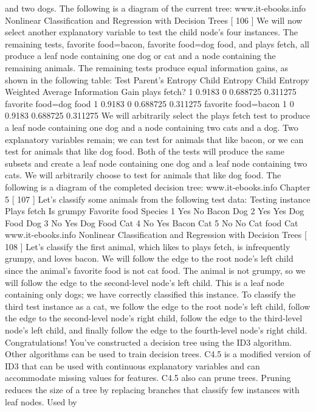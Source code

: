 and two dogs. The following is a diagram of the current tree:
www.it-ebooks.info
Nonlinear Classification and Regression with Decision Trees
[ 106 ]
We will now select another explanatory variable to test the child node's four
instances. The remaining tests, favorite food=bacon, favorite food=dog food,
and plays fetch, all produce a leaf node containing one dog or cat and a node
containing the remaining animals. The remaining tests produce equal information
gains, as shown in the following table:
Test Parent's
Entropy
Child
Entropy
Child
Entropy
Weighted
Average
Information
Gain
plays fetch? 1 0.9183 0 0.688725 0.311275
favorite
food=dog
food
1 0.9183 0 0.688725 0.311275
favorite
food=bacon 1 0 0.9183 0.688725 0.311275
We will arbitrarily select the plays fetch test to produce a leaf node containing one
dog and a node containing two cats and a dog. Two explanatory variables remain;
we can test for animals that like bacon, or we can test for animals that like dog food.
Both of the tests will produce the same subsets and create a leaf node containing one
dog and a leaf node containing two cats. We will arbitrarily choose to test for animals
that like dog food. The following is a diagram of the completed decision tree:
www.it-ebooks.info
Chapter 5
[ 107 ]
Let's classify some animals from the following test data:
Testing instance Plays fetch Is grumpy Favorite food Species
1 Yes No Bacon Dog
2 Yes Yes Dog Food Dog
3 No Yes Dog Food Cat
4 No Yes Bacon Cat
5 No No Cat food Cat
www.it-ebooks.info
Nonlinear Classification and Regression with Decision Trees
[ 108 ]
Let's classify the first animal, which likes to plays fetch, is infrequently grumpy, and
loves bacon. We will follow the edge to the root node's left child since the animal's
favorite food is not cat food. The animal is not grumpy, so we will follow the edge to
the second-level node's left child. This is a leaf node containing only dogs; we have
correctly classified this instance. To classify the third test instance as a cat, we follow
the edge to the root node's left child, follow the edge to the second-level node's right
child, follow the edge to the third-level node's left child, and finally follow the edge
to the fourth-level node's right child.
Congratulations! You've constructed a decision tree using the ID3 algorithm. Other
algorithms can be used to train decision trees. C4.5 is a modified version of ID3
that can be used with continuous explanatory variables and can accommodate
missing values for features. C4.5 also can prune trees. Pruning reduces the size of
a tree by replacing branches that classify few instances with leaf nodes. Used by
